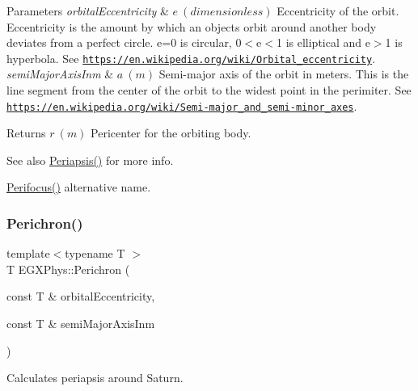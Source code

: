 \begin{DoxyParams}{Parameters}
{\em orbital\+Eccentricity} & $ e\ (dimensionless)$ Eccentricity of the orbit. Eccentricity is the amount by which an objects orbit around another body deviates from a perfect circle. e=0 is circular, 0$<$e$<$1 is elliptical and e$>$1 is hyperbola. See \href{https://en.wikipedia.org/wiki/Orbital_eccentricity}{\tt https\+://en.\+wikipedia.\+org/wiki/\+Orbital\+\_\+eccentricity}. \\
\hline
{\em semi\+Major\+Axis\+Inm} & $ a\ (m)$ Semi-\/major axis of the orbit in meters. This is the line segment from the center of the orbit to the widest point in the perimiter. See \href{https://en.wikipedia.org/wiki/Semi-major_and_semi-minor_axes}{\tt https\+://en.\+wikipedia.\+org/wiki/\+Semi-\/major\+\_\+and\+\_\+semi-\/minor\+\_\+axes}. \\
\hline
\end{DoxyParams}
\begin{DoxyReturn}{Returns}
$ r\ (m)$ Pericenter for the orbiting body. 
\end{DoxyReturn}
\begin{DoxySeeAlso}{See also}
\mbox{\hyperlink{group___e_g_x_phys-_periapsis_gad487212733711bc2ce73c8137c9309c3}{Periapsis()}} for more info. 

\mbox{\hyperlink{group___e_g_x_phys-_periapsis_ga569c67766dd7b590c630caa6582ad000}{Perifocus()}} alternative name. 
\end{DoxySeeAlso}
\mbox{\label{group___e_g_x_phys-_periapsis_gae8dfb0b7ebcd117ba94f2d1a7b2e13ad}} 
\subsubsection{\texorpdfstring{Perichron()}{Perichron()}}
{\footnotesize\ttfamily template$<$typename T $>$ \\
T E\+G\+X\+Phys\+::\+Perichron (\begin{DoxyParamCaption}\item[{const T \&}]{orbital\+Eccentricity,  }\item[{const T \&}]{semi\+Major\+Axis\+Inm }\end{DoxyParamCaption})}



Calculates periapsis around Saturn. 


